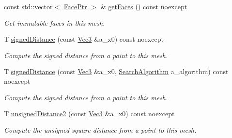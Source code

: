 \begin{DoxyCompactItemize}
\mbox{\label{classDcel_1_1MeshT_afe1bd52d15af160f691bdd83305c84c7}} 
const std\+::vector$<$ \hyperlink{classDcel_1_1MeshT_a6c71642a9e6b36f9d6ab6027035625f0}{Face\+Ptr} $>$ \& \hyperlink{classDcel_1_1MeshT_afe1bd52d15af160f691bdd83305c84c7}{get\+Faces} () const noexcept
\begin{DoxyCompactList}\small\item\em Get immutable faces in this mesh. \end{DoxyCompactList}\item 
T \hyperlink{classDcel_1_1MeshT_aa6f614aa0d93c3345c10150168347497}{signed\+Distance} (const \hyperlink{classDcel_1_1MeshT_a646c5d8f66b3079bca35fe4186493627}{Vec3} \&a\+\_\+x0) const noexcept
\begin{DoxyCompactList}\small\item\em Compute the signed distance from a point to this mesh. \end{DoxyCompactList}\item 
T \hyperlink{classDcel_1_1MeshT_a4fa40378fbd4c31cd50e77da70ef30fd}{signed\+Distance} (const \hyperlink{classDcel_1_1MeshT_a646c5d8f66b3079bca35fe4186493627}{Vec3} \&a\+\_\+x0, \hyperlink{classDcel_1_1MeshT_abb4c3bb7a52804bb041c133f30151399}{Search\+Algorithm} a\+\_\+algorithm) const noexcept
\begin{DoxyCompactList}\small\item\em Compute the signed distance from a point to this mesh. \end{DoxyCompactList}\item 
T \hyperlink{classDcel_1_1MeshT_a8be4c3d6f606b8bc8cc36820de773de1}{unsigned\+Distance2} (const \hyperlink{classDcel_1_1MeshT_a646c5d8f66b3079bca35fe4186493627}{Vec3} \&a\+\_\+x0) const noexcept
\begin{DoxyCompactList}\small\item\em Compute the unsigned square distance from a point to this mesh. \end{DoxyCompactList}\end{DoxyCompactItemize}
